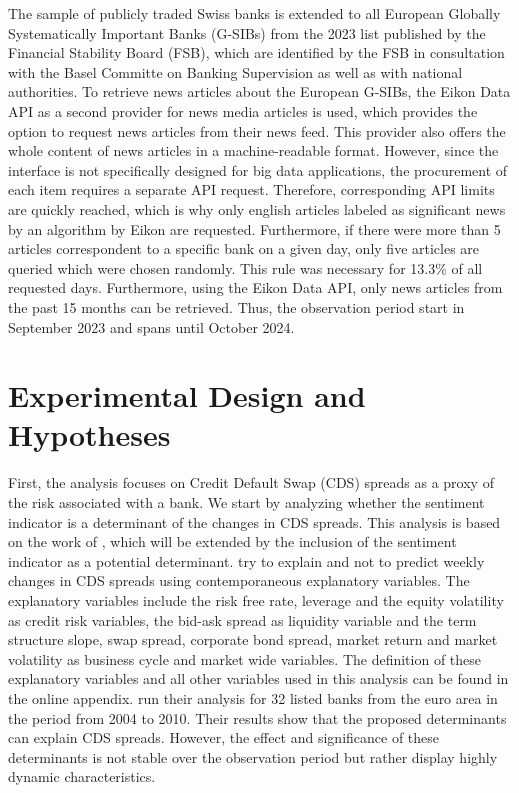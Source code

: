 The sample of publicly traded Swiss banks is extended to all European Globally Systematically Important Banks (G-SIBs) from the 2023 list published by the Financial Stability Board (FSB), which are identified by the FSB in consultation with the Basel Committe on Banking Supervision as well as with national authorities. To retrieve news articles about the European G-SIBs, the Eikon Data API as a second provider for news media articles is used, which provides the option to request news articles from their news feed. This provider also offers the whole content of news articles in a machine-readable format. However, since the interface is not specifically designed for big data applications, the procurement of each item requires a separate API request. Therefore, corresponding API limits are quickly reached, which is why only english articles labeled as significant news by an algorithm by Eikon are requested. Furthermore, if there were more than 5 articles correspondent to a specific bank on a given day, only five articles are queried which were chosen randomly. This rule was necessary for 13.3\% of all requested days. Furthermore, using the Eikon Data API, only news articles from the past 15 months can be retrieved. Thus, the observation period start in September 2023 and spans until October 2024.

\section{Experimental Design and Hypotheses} \label{sec:hypotheses}

First, the analysis focuses on Credit Default Swap (CDS) spreads as a proxy of the risk associated with a bank. We start by analyzing whether the sentiment indicator is a determinant of the changes in CDS spreads. This analysis is based on the work of \cite{annaert2013}, which will be extended by the inclusion of the sentiment indicator as a potential determinant. \cite{annaert2013} try to explain and not to predict weekly changes in CDS spreads using contemporaneous explanatory variables. The explanatory variables include the risk free rate, leverage and the equity volatility as credit risk variables, the bid-ask spread as liquidity variable and the term structure slope, swap spread, corporate bond spread, market return and market volatility as business cycle and market wide variables. The definition of these explanatory variables and all other variables used in this analysis can be found in the online appendix. \cite{annaert2013} run their analysis for 32 listed banks from the euro area in the period from 2004 to 2010. Their results show that the proposed determinants can explain CDS spreads. However, the effect and significance of these determinants is not stable over the observation period but rather display highly dynamic characteristics. \\		

